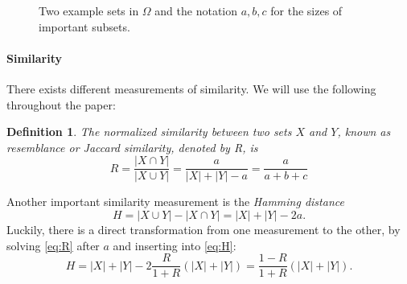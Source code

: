 \documentclass[a4paper]{article}
\newtheorem{mydef}{Definition}
\begin{document}
\begin{figure}[H]
\centering
{}
\caption{Two example sets in $\Omega$ and the notation $a,b,c$ for the sizes of important subsets.}
\label{fig:sets}
\end{figure}

\paragraph{Similarity}

There exists different measurements of similarity. We will use the following throughout the paper:

\begin{framed}
\begin{mydef}\label{def:jaccard}
The normalized similarity between two sets $X$ and $Y$, known as \emph{resemblance} or \emph{Jaccard similarity}, denoted by R, is
\begin{equation}\label{eq:R}
R=\frac{\left| X \cap Y \right|}{\left| X \cup Y \right|} = \frac{a}{\left| X \right| + \left| Y \right| -a}=\frac{a}{a+b+c}
\end{equation}
\end{mydef}
\end{framed}

Another important similarity measurement is the \textit{Hamming distance}
\begin{equation}\label{eq:H}
H=\left| X \cup Y \right| - \left| X \cap Y \right| = \left| X \right| + \left| Y \right| -2a.
\end{equation}
Luckily, there is a direct transformation from one measurement to the other, by solving \vref{eq:R} after $a$ and inserting into \vref{eq:H}:
\begin{equation}
H= \left| X \right| + \left| Y \right| -2 \frac{R}{1+R} \left( |X| + |Y| \right) = \frac{1-R}{1+R} \left( |X| + |Y| \right).
\end{equation}
\end{document}
